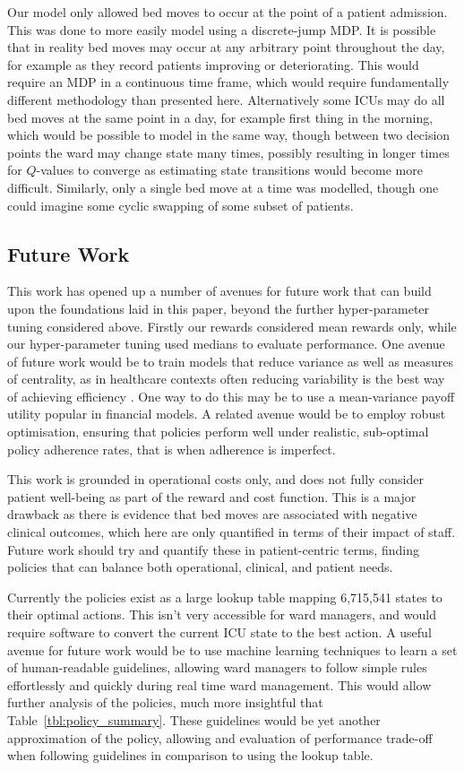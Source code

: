 \documentclass{article}
\begin{document}
Our model only allowed bed moves to occur at the point of a patient admission.
This was done to more easily model using a discrete-jump MDP.
It is possible that in reality bed moves may occur at any arbitrary point
throughout the day, for example as they record patients improving or
deteriorating.
This would require an MDP in a continuous time frame, which would require
fundamentally different methodology than presented here.
Alternatively some ICUs may do all bed moves at the same point in a day, for
example first thing in the morning, which would be possible to model in the same
way, though between two decision points the ward may change state many times,
possibly resulting in longer times for $Q$-values to converge as estimating
state transitions would become more difficult.
Similarly, only a single bed move at a time was modelled, though one could
imagine some cyclic swapping of some subset of patients.

\subsection{Future Work}\label{sec:futue_work}
This work has opened up a number of avenues for future work that can build upon
the foundations laid in this paper, beyond the further hyper-parameter tuning
considered above.
Firstly our rewards considered mean rewards only, while our hyper-parameter
tuning used medians to evaluate performance.
One avenue of future work would be to train models that reduce variance as well
as measures of centrality, as in healthcare contexts often reducing variability
is the best way of achieving efficiency \cite{bekker11}.
One way to do this may be to use a mean-variance payoff utility popular in
financial models.
A related avenue would be to employ robust optimisation, ensuring that policies
perform well under realistic, sub-optimal policy adherence rates, that is when
adherence is imperfect.

This work is grounded in operational costs only, and does not fully consider
patient well-being as part of the reward and cost function.
This is a major drawback as there is evidence that bed moves are associated with
negative clinical outcomes, which here are only quantified in terms of their
impact of staff.
Future work should try and quantify these in patient-centric terms, finding
policies that can balance both operational, clinical, and patient needs.

Currently the policies exist as a large lookup table mapping 6,715,541 states to
their optimal actions.
This isn't very accessible for ward managers, and would require software to
convert the current ICU state to the best action.
A useful avenue for future work would be to use machine learning techniques to
learn a set of human-readable guidelines, allowing ward managers to follow
simple rules effortlessly and quickly during real time ward management.
This would allow further analysis of the policies, much more insightful that
Table~\ref{tbl:policy_summary}.
These guidelines would be yet another approximation of the policy, allowing and
evaluation of performance trade-off when following guidelines in comparison to
using the lookup table.
\end{document}
